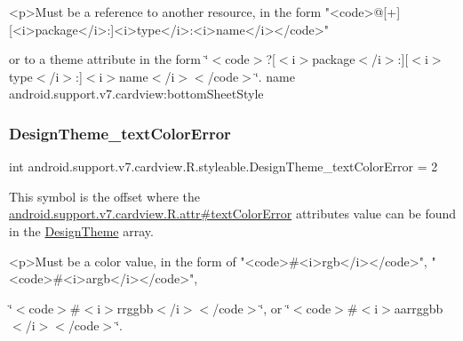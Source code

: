 \begin{DoxyVerb}      <p>Must be a reference to another resource, in the form "<code>@[+][<i>package</i>:]<i>type</i>:<i>name</i></code>"
\end{DoxyVerb}
 or to a theme attribute in the form \char`\"{}$<$code$>$?\mbox{[}$<$i$>$package$<$/i$>$\+:\mbox{]}\mbox{[}$<$i$>$type$<$/i$>$\+:\mbox{]}$<$i$>$name$<$/i$>$$<$/code$>$\char`\"{}.  name android.\+support.\+v7.\+cardview\+:bottom\+Sheet\+Style \mbox{\label{classandroid_1_1support_1_1v7_1_1cardview_1_1R_1_1styleable_a4f7faa1dd10a899663c85c1c21cfe8a2}} 
\subsubsection{\texorpdfstring{Design\+Theme\+\_\+text\+Color\+Error}{DesignTheme\_textColorError}}
{\footnotesize\ttfamily int android.\+support.\+v7.\+cardview.\+R.\+styleable.\+Design\+Theme\+\_\+text\+Color\+Error = 2\hspace{0.3cm}{\ttfamily [static]}}

This symbol is the offset where the \hyperlink{classandroid_1_1support_1_1v7_1_1cardview_1_1R_1_1attr_a6ebe55f0aafed61cb45ed177453eb969}{android.\+support.\+v7.\+cardview.\+R.\+attr\#text\+Color\+Error} attribute\textquotesingle{}s value can be found in the \hyperlink{classandroid_1_1support_1_1v7_1_1cardview_1_1R_1_1styleable_af2ab89f285aaee8ac3e0729dec94e16d}{Design\+Theme} array.

\begin{DoxyVerb}      <p>Must be a color value, in the form of "<code>#<i>rgb</i></code>", "<code>#<i>argb</i></code>",
\end{DoxyVerb}
 \char`\"{}$<$code$>$\#$<$i$>$rrggbb$<$/i$>$$<$/code$>$\char`\"{}, or \char`\"{}$<$code$>$\#$<$i$>$aarrggbb$<$/i$>$$<$/code$>$\char`\"{}. 

